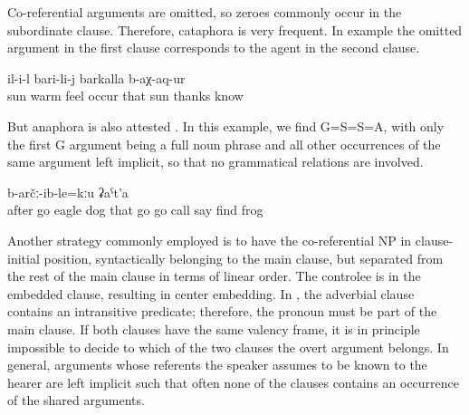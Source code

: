 Co-referential arguments are omitted, so zeroes commonly occur in the subordinate clause. Therefore, cataphora is very frequent. In example  the omitted argument in the first clause corresponds to the agent in the second clause.
%
\begin{exe}
	\ex	\label{ex:When he felt the warmth of the sun, he thanked the sun@35}
		il-i-l	bari-li-j	barkalla 	b-aχ-aq-ur\\
		sun	warm	feel occur	that	sun		thanks 	know\\
	\glt	{} 
\end{exe}

But anaphora is also attested . In this example, we find G=S=S=A, with only the first G argument being a full noun phrase and all other occurrences of the same argument left implicit, so that no grammatical relations are involved.
%
\begin{exe}
	\ex	\label{ex:The bird run (i.e. flies) after him and his dog, and they run and run, and shout, but they did not find the frog@36}
	\gll	[hitːi	b-uq-un-ne	č'aka	χːʷe-j=ra	hel-i-j=ra]	[sa-r-b-uq-un-ne,	sa-r-b-uq-un-ne] 	[waˁw b-ik'-ul]	b-arčː-ib-le=kːu	ʡaˁt'a\\
		after	go	eagle	dog	that	go	go	call say	find	frog\\
	\glt	{}
\end{exe}

Another strategy commonly employed is to have the co-referential NP in clause-initial position, syntactically belonging to the main clause, but separated from the rest of the main clause in terms of linear order. The controlee is in the embedded clause, resulting in center embedding. In , the adverbial clause contains an intransitive predicate; therefore, the pronoun   must be part of the main clause. If both clauses have the same valency frame, it is in principle impossible to decide to which of the two clauses the overt argument belongs. In general, arguments whose referents the speaker assumes to be known to the hearer are left implicit such that often none of the clauses contains an occurrence of the shared arguments.

